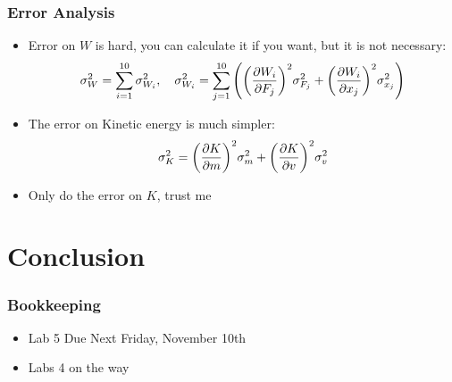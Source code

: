 \documentclass[handout,aspectratio=169]{beamer}
\begin{document}
\begin{frame}
  \frametitle{Error Analysis}
  \begin{itemize}
  \item[\Large\frownie] Error on $W$ is hard, you can calculate it if you want, but it is not necessary:
    \begin{align*}
      \sigma_W^2=\sum_{i=1}^{10}\sigma_{W_i}^2,\quad
      \sigma_{W_i}^2=\sum_{j=1}^{10}\qty(\qty(\pdv{W_i}{F_j})^2\sigma_{F_j}^2
      +\qty(\pdv{W_i}{x_j})^2\sigma_{x_j}^2)
    \end{align*}
  \item[\Large\smiley] The error on Kinetic energy is much simpler:
    \begin{align*}
      \sigma_K^2=\qty(\pdv{K}{m})^2\sigma^2_{m}+\qty(\pdv{K}{v})^2\sigma^2_{v}
    \end{align*}
  \item Only do the error on $K$, \pause trust me
  \end{itemize}
\end{frame}

\section{Conclusion}
\begin{frame}
  \frametitle{Bookkeeping}
  \begin{itemize}
  \item Lab 5 Due Next Friday, November 10th
  \item Labs 4 on the way
  \end{itemize}
\end{frame}
\end{document}
